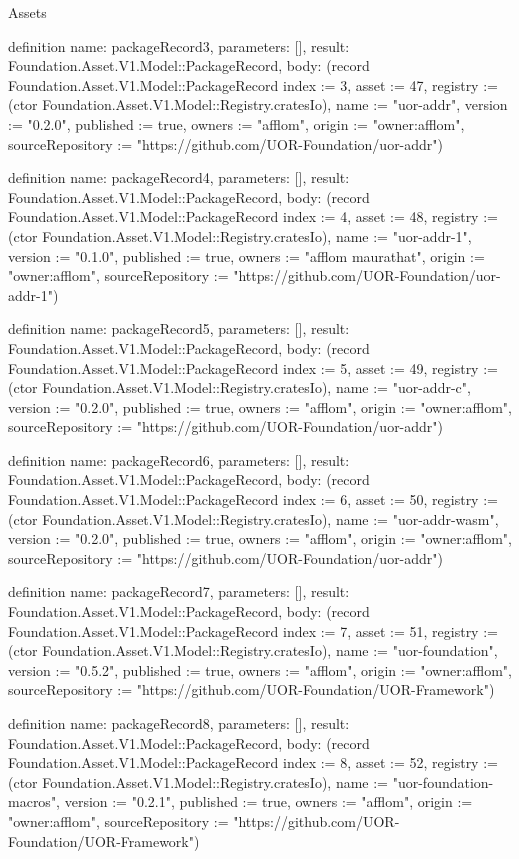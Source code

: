 \begin{lexlean}{Assets}
\begin{semanticmodule}
definition{
  name: packageRecord3,
  parameters: [],
  result: Foundation.Asset.V1.Model::PackageRecord,
  body: (record Foundation.Asset.V1.Model::PackageRecord {index := 3, asset := 47, registry := (ctor Foundation.Asset.V1.Model::Registry.cratesIo), name := "uor-addr", version := "0.2.0", published := true, owners := "afflom", origin := "owner:afflom", sourceRepository := "https://github.com/UOR-Foundation/uor-addr"})
}

definition{
  name: packageRecord4,
  parameters: [],
  result: Foundation.Asset.V1.Model::PackageRecord,
  body: (record Foundation.Asset.V1.Model::PackageRecord {index := 4, asset := 48, registry := (ctor Foundation.Asset.V1.Model::Registry.cratesIo), name := "uor-addr-1", version := "0.1.0", published := true, owners := "afflom maurathat", origin := "owner:afflom", sourceRepository := "https://github.com/UOR-Foundation/uor-addr-1"})
}

definition{
  name: packageRecord5,
  parameters: [],
  result: Foundation.Asset.V1.Model::PackageRecord,
  body: (record Foundation.Asset.V1.Model::PackageRecord {index := 5, asset := 49, registry := (ctor Foundation.Asset.V1.Model::Registry.cratesIo), name := "uor-addr-c", version := "0.2.0", published := true, owners := "afflom", origin := "owner:afflom", sourceRepository := "https://github.com/UOR-Foundation/uor-addr"})
}

definition{
  name: packageRecord6,
  parameters: [],
  result: Foundation.Asset.V1.Model::PackageRecord,
  body: (record Foundation.Asset.V1.Model::PackageRecord {index := 6, asset := 50, registry := (ctor Foundation.Asset.V1.Model::Registry.cratesIo), name := "uor-addr-wasm", version := "0.2.0", published := true, owners := "afflom", origin := "owner:afflom", sourceRepository := "https://github.com/UOR-Foundation/uor-addr"})
}

definition{
  name: packageRecord7,
  parameters: [],
  result: Foundation.Asset.V1.Model::PackageRecord,
  body: (record Foundation.Asset.V1.Model::PackageRecord {index := 7, asset := 51, registry := (ctor Foundation.Asset.V1.Model::Registry.cratesIo), name := "uor-foundation", version := "0.5.2", published := true, owners := "afflom", origin := "owner:afflom", sourceRepository := "https://github.com/UOR-Foundation/UOR-Framework"})
}

definition{
  name: packageRecord8,
  parameters: [],
  result: Foundation.Asset.V1.Model::PackageRecord,
  body: (record Foundation.Asset.V1.Model::PackageRecord {index := 8, asset := 52, registry := (ctor Foundation.Asset.V1.Model::Registry.cratesIo), name := "uor-foundation-macros", version := "0.2.1", published := true, owners := "afflom", origin := "owner:afflom", sourceRepository := "https://github.com/UOR-Foundation/UOR-Framework"})
}


\end{semanticmodule}
\end{lexlean}
